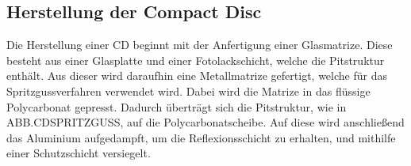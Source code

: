 \subsection{Herstellung der Compact Disc}
\label{subsec:cdherstellung}

Die Herstellung einer CD beginnt mit der Anfertigung einer Glasmatrize. Diese
besteht aus einer Glasplatte und einer Fotolackschicht, welche die Pitstruktur
enthält. Aus dieser wird daraufhin eine Metallmatrize gefertigt, welche für das
Spritzgussverfahren verwendet wird. Dabei wird die Matrize in das flüssige
Polycarbonat gepresst. Dadurch überträgt sich die Pitstruktur, wie in
ABB.CDSPRITZGUSS, auf die Polycarbonatscheibe. Auf diese wird anschließend das
Aluminium aufgedampft, um die Reflexionsschicht zu erhalten, und mithilfe einer
Schutzschicht versiegelt. \cite{cdp}

